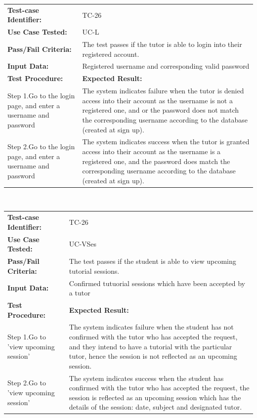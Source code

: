 \documentclass[12pt]{article}
\begin{document}
{\begin{tabular}{| p{8cm} | p{8cm} |} \hline
	\textbf{Test-case Identifier:}& TC-26\\
	\textbf{Use Case Tested:}& UC-L\\
	\textbf{Pass/Fail Criteria:}& The test passes if the tutor is able to login into their registered account.\\
	\textbf{Input Data:}& Registered username and corresponding valid password\\\hline
	\textbf{Test Procedure:}& \textbf{Expected Result:} \\\hline
	Step 1.Go to the login page, and enter a username and password & The system indicates failure when the tutor is denied access into their account as the username is not a registered one, and or the password does not match the corresponding username according to the database (created at sign up). \\
	Step 2.Go to the login page, and enter a username and password & The system indicates success when the tutor is granted access into their account as the username is  a registered one, and  the password does  match the corresponding username according to the database (created at sign up).\\
		\hline
\end{tabular}
\\



\begin{tabular}{| p{8cm} | p{8cm} |} \hline
	\textbf{Test-case Identifier:}& TC-26\\
	\textbf{Use Case Tested:}& UC-VSes\\
	\textbf{Pass/Fail Criteria:}& The test passes if the student is able to view upcoming tutorial sessions.\\
	\textbf{Input Data:}& Confirmed tutuorial sessions which have been accepted by a tutor\\\hline
	\textbf{Test Procedure:}& \textbf{Expected Result:} \\\hline
	Step 1.Go to 'view upcoming session' & The system indicates failure when the student has not confirmed with the tutor who has accepted the request, and they intend to have a tutorial with the particular tutor, hence the session is not reflected as an upcoming session. \\
	Step 2.Go to 'view upcoming session' & The system indicates success when the student has confirmed with the tutor who has accepted the request, the session is reflected as an upcoming session which has the details of the session: date, subject and designated tutor. \\
		\hline
\end{tabular}
\\

}
\end{document}
